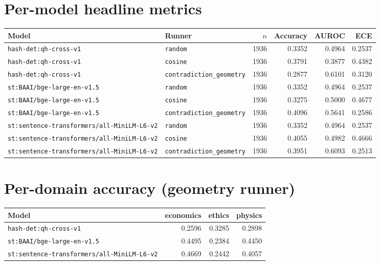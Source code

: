 \documentclass[11pt]{article}
\begin{document}
\section{Per-model headline metrics}
\begin{tabular}{l l r r r r}
\toprule
Model & Runner & $n$ & Accuracy & AUROC & ECE \\
\midrule
\texttt{hash-det:qh-cross-v1} & \texttt{random} & 1936 & 0.3352 & 0.4964 & 0.2537 \\
\texttt{hash-det:qh-cross-v1} & \texttt{cosine} & 1936 & 0.3791 & 0.3877 & 0.4382 \\
\texttt{hash-det:qh-cross-v1} & \texttt{contradiction\_geometry} & 1936 & 0.2877 & 0.6101 & 0.3120 \\
\texttt{st:BAAI/bge-large-en-v1.5} & \texttt{random} & 1936 & 0.3352 & 0.4964 & 0.2537 \\
\texttt{st:BAAI/bge-large-en-v1.5} & \texttt{cosine} & 1936 & 0.3275 & 0.5000 & 0.4677 \\
\texttt{st:BAAI/bge-large-en-v1.5} & \texttt{contradiction\_geometry} & 1936 & 0.4096 & 0.5641 & 0.2586 \\
\texttt{st:sentence-transformers/all-MiniLM-L6-v2} & \texttt{random} & 1936 & 0.3352 & 0.4964 & 0.2537 \\
\texttt{st:sentence-transformers/all-MiniLM-L6-v2} & \texttt{cosine} & 1936 & 0.4055 & 0.4982 & 0.4666 \\
\texttt{st:sentence-transformers/all-MiniLM-L6-v2} & \texttt{contradiction\_geometry} & 1936 & 0.3951 & 0.6093 & 0.2513 \\
\bottomrule
\end{tabular}




\section{Per-domain accuracy (geometry runner)}
\begin{tabular}{l r r r}
\toprule
Model & economics & ethics & physics \\
\midrule
\texttt{hash-det:qh-cross-v1} & 0.2596 & 0.3285 & 0.2898 \\
\texttt{st:BAAI/bge-large-en-v1.5} & 0.4495 & 0.2384 & 0.4450 \\
\texttt{st:sentence-transformers/all-MiniLM-L6-v2} & 0.4669 & 0.2442 & 0.4057 \\
\bottomrule
\end{tabular}
\end{document}
